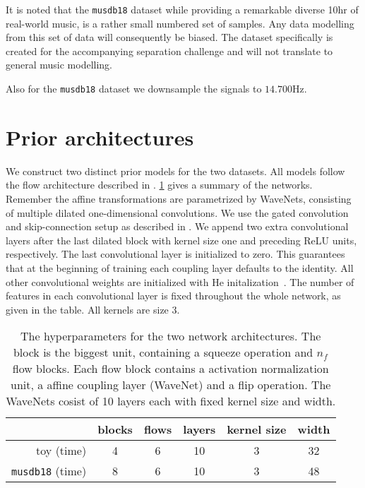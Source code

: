 It is noted that the \texttt{musdb18} dataset while providing a remarkable diverse 10hr of real-world music, is a rather small numbered set of samples. Any data modelling from this set of data will consequently be biased. The dataset specifically is created for the accompanying separation challenge and will not translate to general music modelling.

Also for the \texttt{musdb18} dataset we downsample the signals to \(14.700 \si{\Hz}\).

\section{Prior architectures}

We construct two distinct prior models for the two datasets. All models follow the flow architecture described in . \cref{tab:priors} gives a summary of the networks. Remember the affine transformations are parametrized by WaveNets, consisting of multiple dilated one-dimensional convolutions. We use the gated convolution and skip-connection setup as described in . We append two extra convolutional layers after the last dilated block with kernel size one and preceding ReLU units, respectively. The last convolutional layer is initialized to zero. This guarantees that at the beginning of training each coupling layer defaults to the identity. All other convolutional weights are initialized with He initalization~\cite{heDelving2015}. The number of features in each convolutional layer is fixed throughout the whole network, as given in the table. All kernels are size \(3\).

\begin{table}
    \begin{tabular}{rccccc}
        \toprule
                                & blocks & flows & layers & kernel size & width   \\
        \midrule
        toy (time)              & 4      & 6     & 10     & 3           & 32      \\
        \texttt{musdb18} (time) & 8      & 6     & 10     & 3           & 48      \\
        \bottomrule
    \end{tabular}%
    \caption{The hyperparameters for the two network architectures. The block is the biggest unit, containing a squeeze operation and \(n_f\) flow blocks. Each flow block contains a activation normalization unit, a affine coupling layer (WaveNet) and a flip operation. The WaveNets cosist of 10 layers each with fixed kernel size and width.}%
    \label{tab:priors}%
\end{table}

